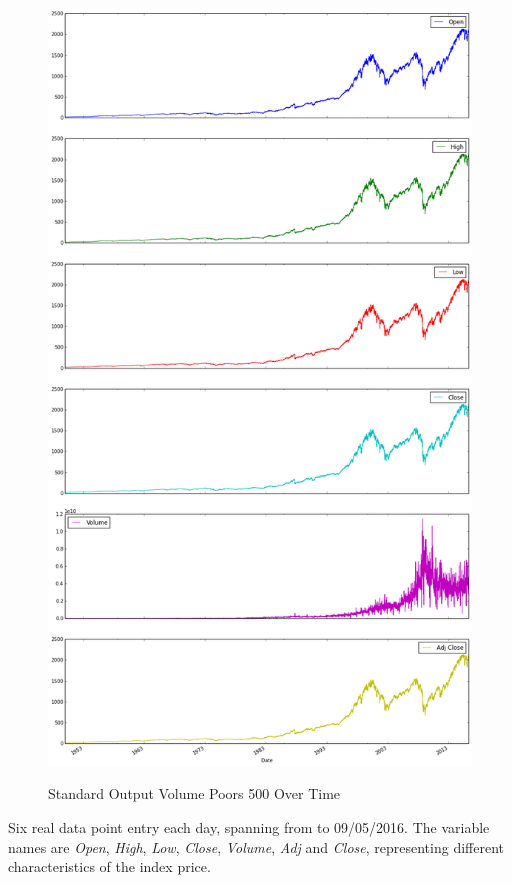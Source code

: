 \begin{figure}[bth]
  \myfloatalign
  {\includegraphics[width=1\linewidth]
    {gfx/standard-and-poors-500-over-time}}
  \caption{Standard Output Volume Poors 500
    Over Time}
  \label{fig:standard-and-poors-500-over-time}
\end{figure}

Six real data point entry each day, spanning from to 09/05/2016. The
variable names are \textit{Open}, \textit{High}, \textit{Low},
\textit{Close}, \textit{Volume}, \textit{Adj} and \textit{Close},
representing different characteristics of the index price.

